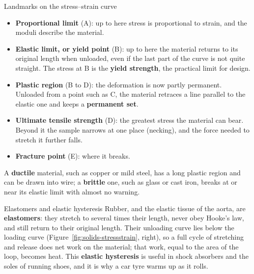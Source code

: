 \begin{figure}[htbp]
\centering
{}
\end{figure}

\begin{defbox}{Landmarks on the stress--strain curve}
\begin{itemize}
\item \textbf{Proportional limit} (A): up to here stress is proportional to strain, and the moduli
      describe the material.
\item \textbf{Elastic limit, or yield point} (B): up to here the material returns to its original
      length when unloaded, even if the last part of the curve is not quite straight. The stress at B is
      the \textbf{yield strength}, the practical limit for design.
\item \textbf{Plastic region} (B to D): the deformation is now partly permanent. Unloaded from a point
      such as C, the material retraces a line parallel to the elastic one and keeps a \textbf{permanent
      set}.
\item \textbf{Ultimate tensile strength} (D): the greatest stress the material can bear. Beyond it the
      sample narrows at one place (necking), and the force needed to stretch it further falls.
\item \textbf{Fracture point} (E): where it breaks.
\end{itemize}
A \textbf{ductile} material, such as copper or mild steel, has a long plastic region and can be drawn into
wire; a \textbf{brittle} one, such as glass or cast iron, breaks at or near its elastic limit with almost
no warning.
\end{defbox}

\begin{remarkbox}{Elastomers and elastic hysteresis}
Rubber, and the elastic tissue of the aorta, are \textbf{elastomers}: they stretch to several times their
length, never obey Hooke's law, and still return to their original length. Their unloading curve lies
below the loading curve (Figure~\ref{fig:solids-stressstrain}, right), so a full cycle of stretching and
release does net work on the material; that work, equal to the area of the loop, becomes heat. This
\textbf{elastic hysteresis} is useful in shock absorbers and the soles of running shoes, and it is why a
car tyre warms up as it rolls.
\end{remarkbox}

